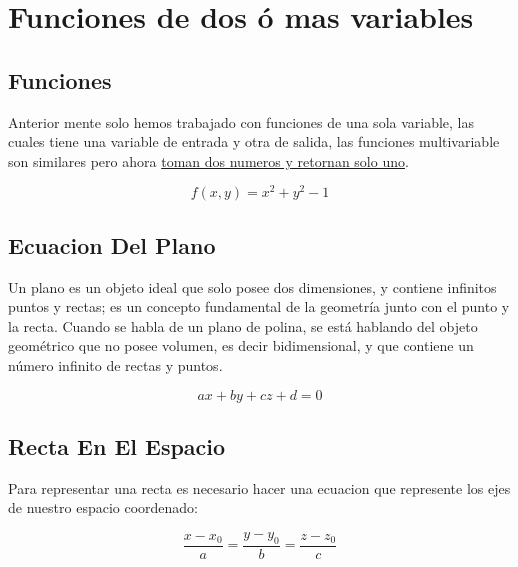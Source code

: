 \documentclass{article}
\begin{document}
\section{Funciones de dos ó mas variables}
\label{sec:orga906a36}
\subsection{Funciones}
\label{sec:orgce4350c}
Anterior mente solo hemos trabajado con funciones de una sola variable, las cuales tiene una variable de entrada y otra de salida, las funciones multivariable son similares pero ahora \uline{toman dos numeros y retornan solo uno}. 

\[
f(x,y) = x^2 + y^2 - 1
\]

\subsection{Ecuacion Del Plano}
\label{sec:org5ace169}
Un plano es un objeto ideal que solo posee dos dimensiones, y contiene infinitos puntos y rectas; es un concepto fundamental de la geometría junto con el punto y la recta. Cuando se habla de un plano de polina, se está hablando del objeto geométrico que no posee volumen, es decir bidimensional, y que contiene un número infinito de rectas y puntos. 

\[ax+by+cz+d=0\]

\subsection{Recta En El Espacio}
\label{sec:org0bc59bb}
Para representar una recta es necesario hacer una ecuacion que represente los ejes de nuestro espacio coordenado:

\[
\frac{x-x_0}{a} = \frac{y-y_0}{b} = \frac{z-z_0}{c}
\]
\end{document}
